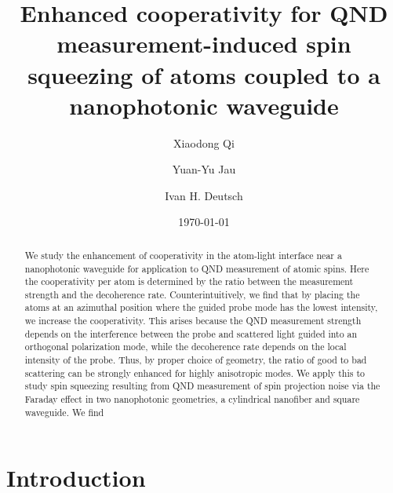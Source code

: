 \documentclass[preprint,aps,pra,onecolumn,superscriptaddress]{revtex4-1} %
\begin{document}
\title{Enhanced cooperativity for QND measurement-induced spin squeezing of atoms coupled to a nanophotonic waveguide}
\author{Xiaodong Qi}
\author{Yuan-Yu Jau}
\author{Ivan H. Deutsch}
\date{\today}

\begin{abstract}
We study the enhancement of cooperativity in the atom-light interface near a nanophotonic waveguide for application to QND measurement of atomic spins.  Here the cooperativity per atom is determined by the ratio between the  measurement strength and the decoherence rate.  Counterintuitively, we find that by placing the atoms at an azimuthal position where the guided probe mode has the lowest intensity, we increase the cooperativity.  This arises because the QND measurement strength depends on the interference between the probe and scattered light guided into an orthogonal polarization mode, while the decoherence rate depends on the local intensity of the probe.  Thus, by proper choice of geometry, the ratio of good to bad scattering can be strongly enhanced for highly anisotropic modes. We apply this to study spin squeezing resulting from QND measurement of spin projection noise via the Faraday effect in two nanophotonic geometries, a cylindrical nanofiber and square waveguide.  We find
\end{abstract}

\maketitle


\renewcommand{\thesubfigure}{(\alph{subfigure})}

\section{Introduction}
\end{document}
